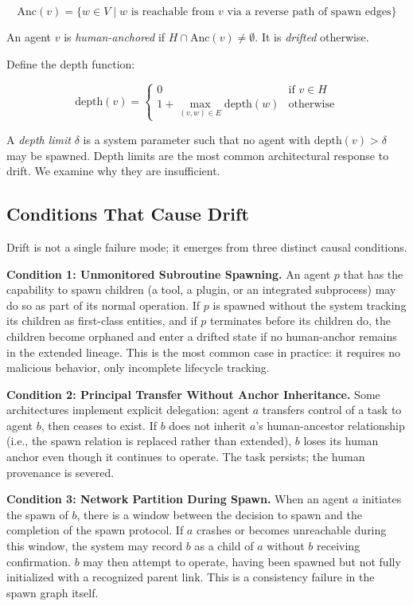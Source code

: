 \[
\mathrm{Anc}(v) = \{ w \in V \mid w \text{ is reachable from } v \text{ via a reverse path of spawn edges} \}
\]

An agent $v$ is \emph{human-anchored} if $H \cap \mathrm{Anc}(v) \neq \emptyset$. It is \emph{drifted} otherwise.

Define the depth function:

\[
\mathrm{depth}(v) = \begin{cases}
0 & \text{if } v \in H \\
1 + \max_{(v,w) \in E} \mathrm{depth}(w) & \text{otherwise}
\end{cases}
\]

A \emph{depth limit} $\delta$ is a system parameter such that no agent with $\mathrm{depth}(v) > \delta$ may be spawned. Depth limits are the most common architectural response to drift. We examine why they are insufficient.

\subsection{Conditions That Cause Drift}

Drift is not a single failure mode; it emerges from three distinct causal conditions.

\textbf{Condition 1: Unmonitored Subroutine Spawning.}
An agent $p$ that has the capability to spawn children (a tool, a plugin, or an integrated subprocess) may do so as part of its normal operation. If $p$ is spawned without the system tracking its children as first-class entities, and if $p$ terminates before its children do, the children become orphaned and enter a drifted state if no human-anchor remains in the extended lineage. This is the most common case in practice: it requires no malicious behavior, only incomplete lifecycle tracking.

\textbf{Condition 2: Principal Transfer Without Anchor Inheritance.}
Some architectures implement explicit delegation: agent $a$ transfers control of a task to agent $b$, then ceases to exist. If $b$ does not inherit $a$'s human-ancestor relationship (i.e., the spawn relation is replaced rather than extended), $b$ loses its human anchor even though it continues to operate. The task persists; the human provenance is severed.

\textbf{Condition 3: Network Partition During Spawn.}
When an agent $a$ initiates the spawn of $b$, there is a window between the decision to spawn and the completion of the spawn protocol. If $a$ crashes or becomes unreachable during this window, the system may record $b$ as a child of $a$ without $b$ receiving confirmation. $b$ may then attempt to operate, having been spawned but not fully initialized with a recognized parent link. This is a consistency failure in the spawn graph itself.

